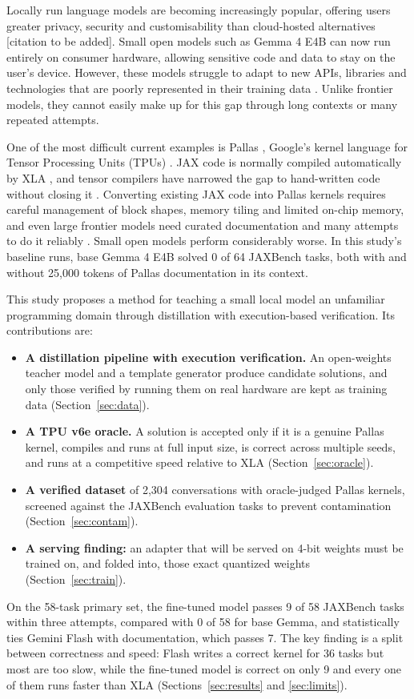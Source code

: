 \documentclass[conference]{IEEEtran}
\begin{document}
Locally run language models are becoming increasingly popular, offering users greater privacy, security and customisability
than cloud-hosted alternatives [citation to be added]. Small open models such as Gemma 4 E4B \cite{gemma4} can now run entirely
on consumer hardware, allowing sensitive code and data to stay on the user's device. However, these models struggle to adapt to
new APIs, libraries and technologies that are poorly represented in their training data
\cite{codex,alphacode,codellama,starcoder}. Unlike frontier models, they cannot easily make up for this gap through long
contexts or many repeated attempts.

One of the most difficult current examples is Pallas \cite{pallas}, Google's kernel language for Tensor Processing Units
(TPUs) \cite{tpu}. JAX code is normally compiled automatically by XLA \cite{jax,mlir}, and tensor compilers have narrowed the
gap to hand-written code without closing it \cite{halide,tvm,ansor}. Converting existing JAX code into Pallas kernels requires
careful management of block shapes, memory tiling and limited on-chip memory, and even large frontier models need curated
documentation and many attempts to do it reliably \cite{jaxbench}. Small open models perform considerably worse. In this
study's baseline runs, base Gemma 4 E4B solved 0 of 64 JAXBench tasks, both with and without 25,000 tokens of Pallas
documentation in its context.

This study proposes a method for teaching a small local model an unfamiliar programming domain through distillation
\cite{distill} with execution-based verification. Its contributions are:
\begin{itemize}
\item \textbf{A distillation pipeline with execution verification.} An open-weights teacher model and a template generator
produce candidate solutions, and only those verified by running them on real hardware are kept as training data
(Section~\ref{sec:data}).
\item \textbf{A TPU v6e oracle.} A solution is accepted only if it is a genuine Pallas kernel, compiles and runs at full input
size, is correct across multiple seeds, and runs at a competitive speed relative to XLA (Section~\ref{sec:oracle}).
\item \textbf{A verified dataset} of 2,304 conversations with oracle-judged Pallas kernels, screened against the JAXBench
evaluation tasks to prevent contamination (Section~\ref{sec:contam}).
\item \textbf{A serving finding:} an adapter that will be served on 4-bit weights must be trained on, and folded into, those
exact quantized weights (Section~\ref{sec:train}).
\end{itemize}
On the 58-task primary set, the fine-tuned model passes 9 of 58 JAXBench tasks within three attempts, compared with 0 of 58
for base Gemma, and statistically ties Gemini Flash with documentation, which passes 7. The key finding is a split between
correctness and speed: Flash writes a correct kernel for 36 tasks but most are too slow, while the fine-tuned model is correct
on only 9 and every one of them runs faster than XLA (Sections~\ref{sec:results} and \ref{sec:limits}).
\end{document}
